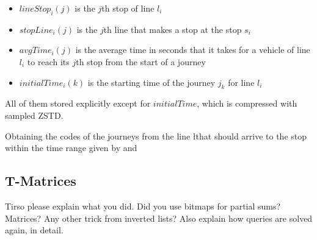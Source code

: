 \documentclass[runningheads]{llncs}
\newcommand{\acumm}{T-Matrices} %
\begin{document}
\begin{itemize}
    \item $lineStop_i(j)$ is the $j$th stop of line $l_i$
    \item $stopLine_i(j)$ is the $j$th line that makes a stop at the stop $s_i$
    \item $avgTime_i(j)$ is the average time in seconds that it takes for a vehicle of line $l_i$ to reach its $j$th stop from the start of a journey
    \item $initialTime_i(k)$ is the starting time of the journey $j_k$ for line $l_i$
\end{itemize}

All of them stored explicitly except for $initialTime$, which is compressed with sampled ZSTD.

\begin{algorithm}[H]
 
 
 \caption{Obtaining the codes of the journeys from the line \l that should arrive to the stop \s within the time range given by \ta and \tz}
\end{algorithm}

\subsection{\acumm}
Tirso please explain what you did. Did you use bitmaps for partial sums? Matrices? Any other trick from inverted lists? Also explain how queries are solved again, in detail.
\end{document}

